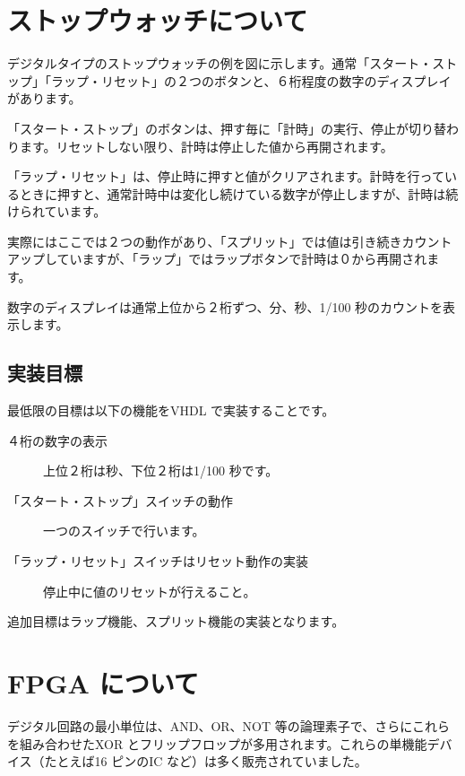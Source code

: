 \documentclass[letterpaper,10pt,dvipdfmx]{sphinxmanual}
\begin{document}
\chapter{ストップウォッチについて}
\label{02_stopwatch:id1}\label{02_stopwatch::doc}
デジタルタイプのストップウォッチの例を図に示します。通常「スタート・ストップ」「ラップ・リセット」の２つのボタンと、６桁程度の数字のディスプレイがあります。

「スタート・ストップ」のボタンは、押す毎に「計時」の実行、停止が切り替わります。リセットしない限り、計時は停止した値から再開されます。

「ラップ・リセット」は、停止時に押すと値がクリアされます。計時を行っているときに押すと、通常計時中は変化し続けている数字が停止しますが、計時は続けられています。

実際にはここでは２つの動作があり、「スプリット」では値は引き続きカウントアップしていますが、「ラップ」ではラップボタンで計時は０から再開されます。

数字のディスプレイは通常上位から２桁ずつ、分、秒、1/100 秒のカウントを表示します。


\section{実装目標}
\label{02_stopwatch:id2}
最低限の目標は以下の機能をVHDL で実装することです。
\begin{description}
\item[{４桁の数字の表示}] \leavevmode
上位２桁は秒、下位２桁は1/100 秒です。

\item[{「スタート・ストップ」スイッチの動作}] \leavevmode
一つのスイッチで行います。

\item[{「ラップ・リセット」スイッチはリセット動作の実装}] \leavevmode
停止中に値のリセットが行えること。

\end{description}

追加目標はラップ機能、スプリット機能の実装となります。


\chapter{FPGA について}
\label{03_fpga::doc}\label{03_fpga:fpga}
デジタル回路の最小単位は、AND、OR、NOT 等の論理素子で、さらにこれらを組み合わせたXOR とフリップフロップが多用されます。これらの単機能デバイス（たとえば16 ピンのIC など）は多く販売されていました。
\end{document}
